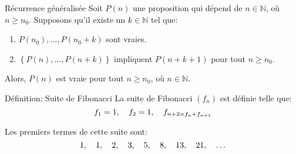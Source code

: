 \documentclass[a4paper]{article}
\begin{document}
\begin{parag}{Récurrence généralisée}
    Soit $P\left(n\right)$ une proposition qui dépend de $n \in \mathbb{N}$, où $n \geq n_0$. Supposons qu'il existe un $k \in \mathbb{N}$ tel que:
    \begin{enumerate}
        \item $P\left(n_0\right), \ldots, P\left(n_0 + k\right)$ sont vraies.
        \item $\left\{P\left(n\right), \ldots, P\left(n + k\right)\right\}$ impliquent $P\left(n + k + 1\right)$ pour tout $n \geq n_0$.
    \end{enumerate}
    
    Alors, $P\left(n\right)$ est vraie pour tout $n \geq n_0$, où $n \in \mathbb{N}$.
\end{parag}

\begin{parag}{Définition: Suite de Fibonacci}
    La suite de Fibonacci $\left(f_n\right)$ est définie telle que: 
    \[f_1 = 1, \quad f_2 = 1, \quad f_{n+2  = f_n + f_{n+1}}\]
    
    Les premiers termes de cette suite sont: 
    \[1, \quad 1, \quad 2, \quad 3, \quad 5, \quad 8, \quad 13, \quad 21, \quad \ldots\]
\end{parag}
\end{document}
